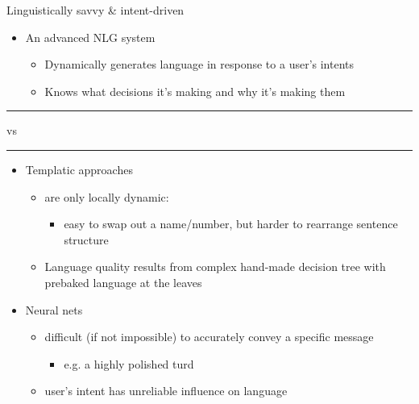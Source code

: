 \documentclass[10pt, compress]{beamer}
\begin{document}
\begin{frame}{Linguistically savvy \& intent-driven}
    \begin{itemize}
    	\item An advanced NLG system
            \begin{itemize}
                \item Dynamically generates language in response to a user's intents\\
                \item Knows what decisions it's making and why it's making them\\
            \end{itemize}
    \end{itemize}
    \pause
    \begin{center}
        \rule{50pt}{0.4pt} vs \rule{50pt}{0.4pt}
     \end{center}
	\begin{itemize}
		\item Templatic approaches
		\begin{itemize}
			\item are only locally dynamic:
			\begin{itemize}
				\item<3-> easy to swap out a name/number, but harder to rearrange sentence structure
			\end{itemize}
			\item Language quality results from complex hand-made decision tree with prebaked language at the leaves
		\end{itemize}

		\item Neural nets
		\begin{itemize}
			\item difficult (if not impossible) to accurately convey a specific message
			\begin{itemize}
				\item<4-> e.g. a highly polished turd
			\end{itemize}
			\item user's intent has unreliable influence on language
		\end{itemize}
	\end{itemize}
\end{frame}
\end{document}

